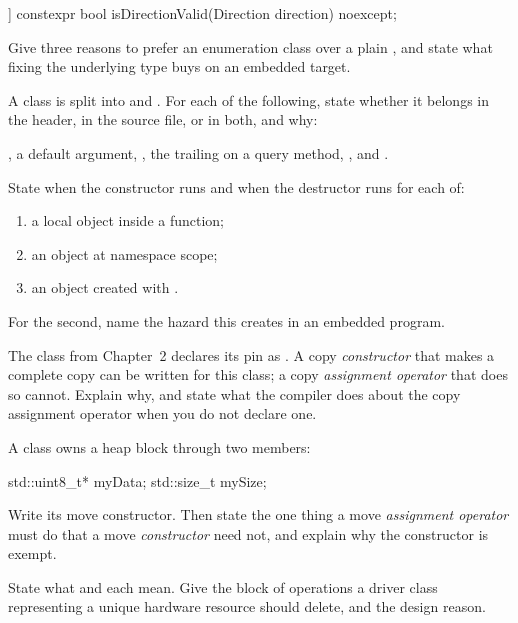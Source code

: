 \begin{cppcode}
[[nodiscard]] constexpr bool isDirectionValid(Direction direction) noexcept;
\end{cppcode}

\noindent Give three reasons to prefer an enumeration class over a plain , and state what
fixing the underlying type buys on an embedded target. 

 A class is split into  and . For
each of the following, state whether it belongs in the header, in the source file, or in both, and
why:

, a default argument, \code{[[nodiscard]]}, the trailing  on a query
method, ,  and . 

 State when the constructor runs and when the destructor runs for each of:
\begin{enumerate}
  \item a local object inside a function;
  \item an object at namespace scope;
  \item an object created with .
\end{enumerate}
For the second, name the hazard this creates in an embedded program. 

\label{exb:q:4}

 The  class from Chapter~2 declares its pin as .
A copy \emph{constructor} that makes a complete copy can be written for this class; a copy
\emph{assignment operator} that does so cannot. Explain why, and state what the compiler does about
the copy assignment operator when you do not declare one. 

 A class  owns a heap block through two members:

\begin{cppcode}
std::uint8_t* myData;
std::size_t mySize;
\end{cppcode}

\noindent Write its move constructor. Then state the one thing a move \emph{assignment operator} must
do that a move \emph{constructor} need not, and explain why the constructor is exempt. 

 State what  and  each mean. Give the block of operations a
driver class representing a unique hardware resource should delete, and the design reason.

